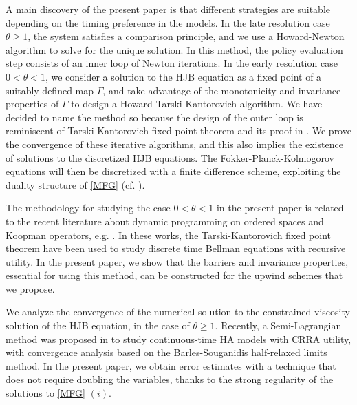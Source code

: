 \documentclass[11pt]{article}
\numberwithin{equation}{section}
\numberwithin{algorithm}{section}
\theoremstyle{plain}
\begin{document}
A main discovery of the present paper is that different strategies are suitable depending on the timing preference in the models. In the late resolution case $\theta\geq 1$, the system satisfies a comparison principle, and we use a Howard-Newton algorithm to solve for the unique solution. In this method, the policy evaluation step consists of an inner loop of Newton iterations. In the early resolution case $0<\theta< 1$, we consider a solution to the HJB equation as a fixed point of a suitably defined map $\Gamma$, and take advantage of the monotonicity and invariance properties of $\Gamma$ to design a Howard-Tarski-Kantorovich algorithm. We have decided to name the method so because the design of the outer loop is reminiscent of Tarski-Kantorovich fixed point theorem and its proof in \cite[Theorem I, p.68]{kantorovitch1939method}.  We prove the convergence of these iterative algorithms, and this also implies the existence of solutions to the discretized HJB equations. The Fokker-Planck-Kolmogorov equations will then be discretized with a finite difference scheme, exploiting the duality structure of \cref{MFG} (cf. \cite{achdou2022income}). \par
The methodology for studying the case $0<\theta< 1$ in the present paper is related to the recent literature about dynamic programming on ordered spaces and Koopman operators, e.g. \cite{bloise2024not,Sargent_Stachurski_2025,Sargent2025}. In these works, the Tarski-Kantorovich fixed point theorem have been used to study discrete time Bellman equations with recursive utility. In the present paper, we show that the barriers and invariance properties, essential for using this method, can be constructed for the upwind schemes that we propose. \par
We analyze the convergence of the numerical solution to the constrained viscosity solution of the HJB equation, in the case of $\theta\geq 1$. Recently, a Semi-Lagrangian method was proposed in \cite{camilli2025semi} to study continuous-time HA models with CRRA utility, with convergence analysis based on the Barles-Souganidis half-relaxed limits method. In the present paper, we obtain error estimates with a technique that  does not require doubling the variables, thanks to the strong regularity of the solutions to \cref{MFG} $(i)$. 
\end{document}

